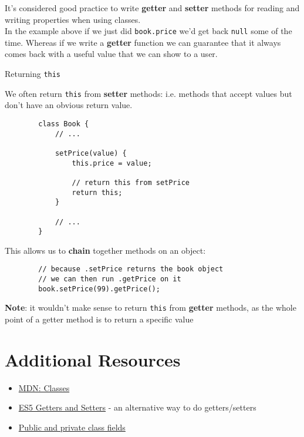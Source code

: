 It's considered good practice to write \textbf{getter} and \textbf{setter} methods for reading and writing properties when using classes.
\\

In the example above if we just did \texttt{book.price} we'd get back \texttt{null} some of the time. Whereas if we write a \textbf{getter} function we can guarantee that it always comes back with a useful value that we can show to a user.


\begin{infobox}{Returning \texttt{this}}

    We often return \texttt{this} from \textbf{setter} methods: i.e. methods that accept values but don't have an obvious return value.

    \begin{verbatim}
        class Book {
            // ...

            setPrice(value) {
                this.price = value;

                // return this from setPrice
                return this;
            }

            // ...
        }
    \end{verbatim}

    This allows us to \textbf{chain} together methods on an object:

    \begin{verbatim}
        // because .setPrice returns the book object
        // we can then run .getPrice on it
        book.setPrice(99).getPrice();
    \end{verbatim}

    \textbf{Note}: it wouldn't make sense to return \texttt{this} from \textbf{getter} methods, as the whole point of a getter method is to return a specific value
\end{infobox}



\section{Additional Resources}

\begin{itemize}[leftmargin=*]
    \item \href{https://developer.mozilla.org/en-US/docs/Web/JavaScript/Reference/Classes}{MDN: Classes}
    \item \href{https://javascriptplayground.com/es5-getters-setters/}{ES5 Getters and Setters} - an alternative way to do getters/setters
    \item \href{https://developers.google.com/web/updates/2018/12/class-fields}{Public and private class fields}
\end{itemize}
